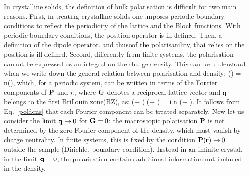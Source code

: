 In crystalline solids, the definition of bulk polarisation is difficult for two main reasons.
First, in treating crystalline solids one imposes periodic boundary conditions to reflect the periodicity of the lattice and the Bloch functions. With periodic boundary conditions, the position operator is ill-defined. Then, a definition of the dipole operator, and thusoof the polarisanility,  that relies on the position is ill-defined.%
Second, differently from finite systems, the polarisation cannot be expressed as an integral on the charge density\cite{Martin1998}.
This can be understood when we write down the general relation between polarisation and density:
\be
\nabla \cdot \PP(\rr) = - n(\rr),
\ee                              
which, for a periodic system, can be written in terms of the Fourier components of ${\bf P}$ and $n$, where ${\bf G}$ denotes a reciprocal lattice vector and ${\bf q}$ belongs to the first Brillouin zone(BZ), as:
\be
(\qq + \GG) \cdot \PP(\qq + \GG) = i n (\qq + \GG).
\label{poldens}
\ee
It follows from Eq.~\ref{poldens} that each Fourier component can be treated separately. Now let us consider the limit ${\bf q} \rightarrow 0$ for ${\bf G}=0$: the macroscopic polarisation ${\bf P}$ is not determined by the zero Fourier component of the density, which must vanish by charge neutrality. In finite systems, this  is fixed by the condition  ${\bf P}({\bf r}) \rightarrow 0 $ outside the sample (Dirichlet boundary condition). Instead in an infinite crystal, in the limit ${\bf q} = 0$, the polarisation contains additional information not included in the density.\cite{Martin1998} 
